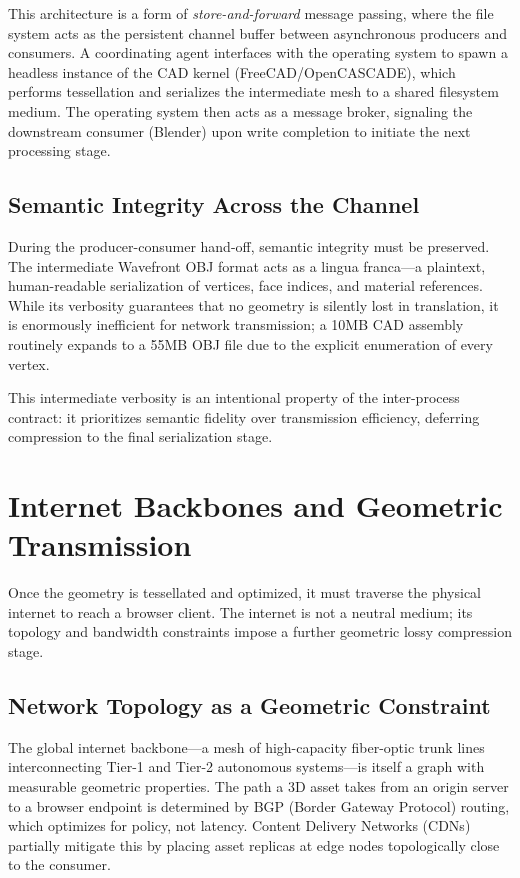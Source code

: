 \documentclass[conference]{IEEEtran}
\begin{document}
This architecture is a form of \textit{store-and-forward} message passing, where the file system acts as the persistent channel buffer between asynchronous producers and consumers. A coordinating agent interfaces with the operating system to spawn a headless instance of the CAD kernel (FreeCAD/OpenCASCADE), which performs tessellation and serializes the intermediate mesh to a shared filesystem medium. The operating system then acts as a message broker, signaling the downstream consumer (Blender) upon write completion to initiate the next processing stage.

\subsection{Semantic Integrity Across the Channel}

During the producer-consumer hand-off, semantic integrity must be preserved. The intermediate Wavefront OBJ format acts as a lingua franca---a plaintext, human-readable serialization of vertices, face indices, and material references. While its verbosity guarantees that no geometry is silently lost in translation, it is enormously inefficient for network transmission; a 10MB CAD assembly routinely expands to a 55MB OBJ file due to the explicit enumeration of every vertex.

This intermediate verbosity is an intentional property of the inter-process contract: it prioritizes semantic fidelity over transmission efficiency, deferring compression to the final serialization stage.

\section{Internet Backbones and Geometric Transmission}
\label{sec:backbone}

Once the geometry is tessellated and optimized, it must traverse the physical internet to reach a browser client. The internet is not a neutral medium; its topology and bandwidth constraints impose a further geometric lossy compression stage.

\subsection{Network Topology as a Geometric Constraint}

The global internet backbone---a mesh of high-capacity fiber-optic trunk lines interconnecting Tier-1 and Tier-2 autonomous systems---is itself a graph with measurable geometric properties. The path a 3D asset takes from an origin server to a browser endpoint is determined by BGP (Border Gateway Protocol) routing, which optimizes for policy, not latency. Content Delivery Networks (CDNs) partially mitigate this by placing asset replicas at edge nodes topologically close to the consumer.
\end{document}
